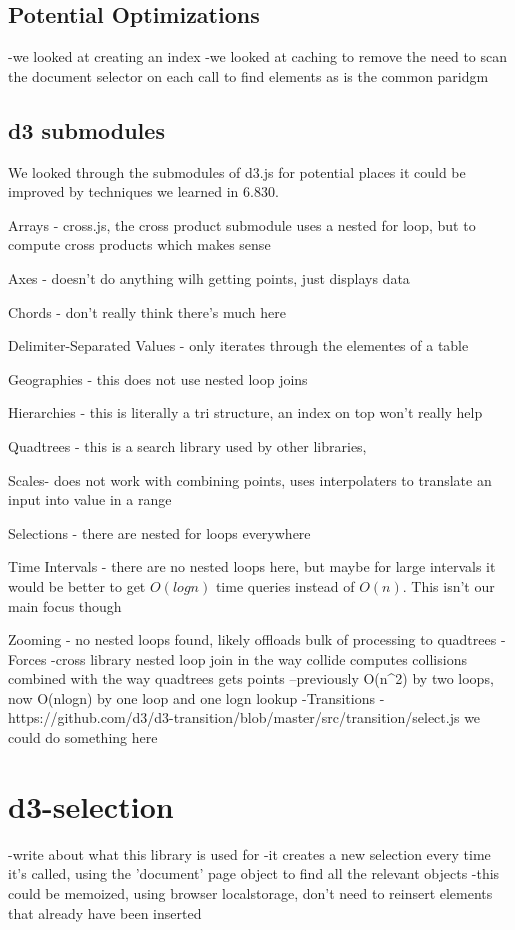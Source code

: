 \documentclass[a4paper]{article}
\begin{document}
\subsection{Potential Optimizations}
-we looked at creating an index
-we looked at caching to remove the need to scan the document selector on each call to find elements as is the common paridgm
\subsection{d3 submodules}
We looked through the submodules of d3.js for potential places it could be improved by techniques we learned in 6.830.

Arrays - cross.js, the cross product submodule uses a nested for loop, but to compute cross products which makes sense

Axes - doesn't do anything wilh getting points, just displays data

Chords - don't really think there's much here

Delimiter-Separated Values - only iterates through the elementes of a table

Geographies - this does not use nested loop joins

Hierarchies - this is literally a tri structure, an index on top won't really help

Quadtrees - this is a search library used by other libraries,

Scales- does not work with combining points, uses interpolaters to translate an input into value in a range

Selections - there are nested for loops everywhere

Time Intervals - there are no nested loops here, but maybe for large intervals it would be better to get $O(logn)$ time queries instead of $O(n)$. This isn't our main focus though

Zooming - no nested loops found, likely offloads bulk of processing to quadtrees
-Forces -cross library nested loop join in the way collide computes collisions combined with the way quadtrees gets points
--previously O(n^2) by two loops, now O(nlogn) by one loop and one logn lookup
-Transitions - https://github.com/d3/d3-transition/blob/master/src/transition/select.js we could do something here

\section{d3-selection}
-write about what this library is used for
-it creates a new selection every time it's called, using the 'document' page object to find all the relevant objects
-this could be memoized, using browser localstorage, don't need to reinsert elements that already have been inserted
\end{document}

